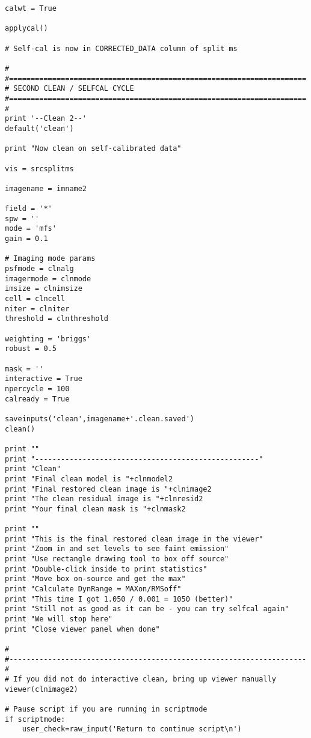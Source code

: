 \begin{verbatim}
calwt = True

applycal()

# Self-cal is now in CORRECTED_DATA column of split ms

#
#=====================================================================
# SECOND CLEAN / SELFCAL CYCLE
#=====================================================================
#
print '--Clean 2--'
default('clean')

print "Now clean on self-calibrated data"

vis = srcsplitms

imagename = imname2

field = '*'
spw = ''
mode = 'mfs'
gain = 0.1

# Imaging mode params
psfmode = clnalg
imagermode = clnmode
imsize = clnimsize
cell = clncell
niter = clniter
threshold = clnthreshold

weighting = 'briggs'
robust = 0.5

mask = ''
interactive = True
npercycle = 100
calready = True

saveinputs('clean',imagename+'.clean.saved')
clean()

print ""
print "----------------------------------------------------"
print "Clean"
print "Final clean model is "+clnmodel2
print "Final restored clean image is "+clnimage2
print "The clean residual image is "+clnresid2
print "Your final clean mask is "+clnmask2

print ""
print "This is the final restored clean image in the viewer"
print "Zoom in and set levels to see faint emission"
print "Use rectangle drawing tool to box off source"
print "Double-click inside to print statistics"
print "Move box on-source and get the max"
print "Calculate DynRange = MAXon/RMSoff"
print "This time I got 1.050 / 0.001 = 1050 (better)"
print "Still not as good as it can be - you can try selfcal again"
print "We will stop here"
print "Close viewer panel when done"

#
#---------------------------------------------------------------------
#
# If you did not do interactive clean, bring up viewer manually
viewer(clnimage2)

# Pause script if you are running in scriptmode
if scriptmode:
    user_check=raw_input('Return to continue script\n')


\end{verbatim}
